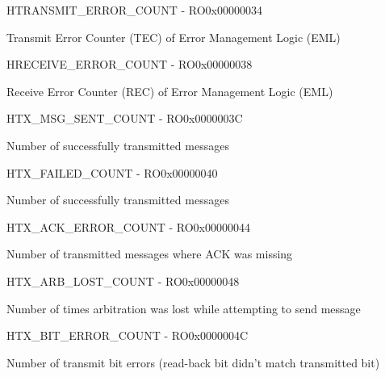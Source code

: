 \documentclass{article}
\begin{document}
\begin{register}{H}{TRANSMIT{\_}ERROR{\_}COUNT - RO}{0x00000034}  \par Transmit Error Counter (TEC) of Error Management Logic (EML) \regnewline
  \label{TRANSMIT_ERROR_COUNT}
\regnewline
\end{register}

\begin{register}{H}{RECEIVE{\_}ERROR{\_}COUNT - RO}{0x00000038}  \par Receive Error Counter (REC) of Error Management Logic (EML) \regnewline
  \label{RECEIVE_ERROR_COUNT}
\regnewline
\end{register}

\begin{register}{H}{TX{\_}MSG{\_}SENT{\_}COUNT - RO}{0x0000003C}  \par Number of successfully transmitted messages \regnewline
  \label{TX_MSG_SENT_COUNT}
\regnewline
\end{register}

\begin{register}{H}{TX{\_}FAILED{\_}COUNT - RO}{0x00000040}  \par Number of successfully transmitted messages \regnewline
  \label{TX_FAILED_COUNT}
\regnewline
\end{register}

\begin{register}{H}{TX{\_}ACK{\_}ERROR{\_}COUNT - RO}{0x00000044}  \par Number of transmitted messages where ACK was missing \regnewline
  \label{TX_ACK_ERROR_COUNT}
\regnewline
\end{register}

\begin{register}{H}{TX{\_}ARB{\_}LOST{\_}COUNT - RO}{0x00000048}  \par Number of times arbitration was lost while attempting to send message \regnewline
  \label{TX_ARB_LOST_COUNT}
\regnewline
\end{register}

\begin{register}{H}{TX{\_}BIT{\_}ERROR{\_}COUNT - RO}{0x0000004C}  \par Number of transmit bit errors (read-back bit didn't match transmitted bit) \regnewline
  \label{TX_BIT_ERROR_COUNT}
\regnewline
\end{register}
\end{document}
